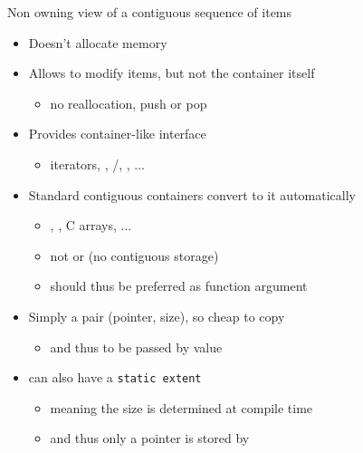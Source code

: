 \begin{frame}[fragile]
  \begin{block}{Non owning view of a contiguous sequence of items}
    \begin{itemize}
    \item Doesn't allocate memory
    \item Allows to modify items, but not the container itself
      \begin{itemize}
      \item no reallocation, push or pop
      \end{itemize}
    \item Provides container-like interface
      \begin{itemize}
      \item iterators, , /, , ...
      \end{itemize}
    \item Standard contiguous containers convert to it automatically
      \begin{itemize}
      \item {}, , C arrays, ...
      \item not  or  (no contiguous storage)
      \item {} should thus be preferred as function argument
      \end{itemize}
    \item Simply a pair (pointer, size), so cheap to copy
      \begin{itemize}
      \item and thus to be passed by value
      \end{itemize}
    \item {} can also have a \texttt{static extent}
      \begin{itemize}
      \item meaning the size is determined at compile time
      \item and thus only a pointer is stored by 
      \end{itemize}
    \end{itemize}
  \end{block}
\end{frame}

